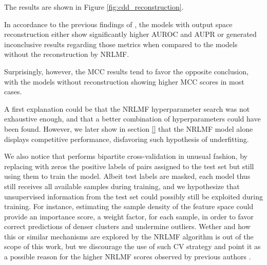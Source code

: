 \documentclass[conference]{IEEEtran}
\begin{document}
The results are shown in Figure \ref{fig:cdd_reconstruction}.

In accordance to the previous findings of \cite{Pliakos_2020}, the models with output space reconstruction either show significantly higher AUROC and AUPR or generated inconclusive results regarding those metrics when compared to the models without the reconstruction by NRLMF.

Surprisingly, however, the MCC results tend to favor the opposite conclusion, with the models without reconstruction showing higher MCC scores in most cases.


A first explanation could be that the NRLMF hyperparameter search was not exhaustive enough, and that a better combination of hyperparameters could have been found. However, we later show in section \ref{} that the NRLMF model alone displays competitive performance, disfavoring such hypothesis of underfitting.

We also notice that \cite{Liu_2017} performs bipartite cross-validation in unusual fashion, by replacing with zeros the positive labels of pairs assigned to the test set but still using them to train the model. Albeit test labels are masked, each model thus still receives all available samples during training, and we hypothesize that unsupervised information from the test set could possibly still be exploited during training. For instance, estimating the sample density of the feature space could provide an importance score, a weight factor, for each sample, in order to favor correct predictions of denser clusters and undermine outliers. Wether and how this or similar mechanisms are explored by the NRLMF algorithm is out of the scope of this work, but we discourage the use of such CV strategy and point it as a possible reason for the higher NRLMF scores observed by previous authors \cite{Pliakos_2020;Liu_2017}.

\end{document}
